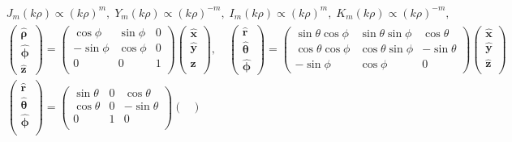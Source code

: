 \documentclass[10pt]{article}
\newcommand{\rhat}{\boldsymbol{\hat{\textbf{r}}}}
\newcommand{\xhat}{\boldsymbol{\hat{\textbf{x}}}}
\newcommand{\yhat}{\boldsymbol{\hat{\textbf{y}}}}
\newcommand{\zhat}{\boldsymbol{\hat{\textbf{z}}}}
\newcommand{\phihat}{\boldsymbol{\hat{\textbf{$\phi$}}}}
\newcommand{\thetahat}{\boldsymbol{\hat{\textbf{$\theta$}}}}
\newcommand{\rhohat}{\boldsymbol{\hat{\textbf{$\rho$}}}}
\begin{document}
\begin{multicols}{2}
\begin{align*}
		& J_m(k \rho) \propto (k \rho)^m, \; Y_m(k \rho) \propto (k \rho)^{-m}, \; I_m(k \rho) \propto (k \rho)^m, \; K_m(k \rho) \propto (k \rho)^{-m}, \tag*{As $\rho \rightarrow 0$} \\
 		&\begin{pmatrix}
			\rhohat \\
			\phihat \\
			\zhat
 		\end{pmatrix} =
 		\begin{pmatrix}
 			\cos \phi & \sin \phi & 0 \\
 			-\sin \phi & \cos \phi & 0 \\
 			0 & 0 & 1 \\
 		\end{pmatrix} 
 		\begin{pmatrix}
 			\xhat \\
 			\yhat \\
 			\zhat \\
 		\end{pmatrix}, \quad
 		\begin{pmatrix}
			\rhat \\
			\thetahat \\
			\phihat
 		\end{pmatrix} =
 		\begin{pmatrix}
			\sin \theta \cos \phi & \sin \theta \sin \phi & \cos \theta\\
			\cos \theta \cos \phi & \cos \theta \sin \phi & - \sin \theta \\
			-\sin \phi & \cos \phi & 0
 		\end{pmatrix} 
 		\begin{pmatrix}
 			\xhat \\
 			\yhat \\
 			\zhat \\
 		\end{pmatrix} \\
 		& \begin{pmatrix}
 			\rhat \\
 			\thetahat \\
 			\phihat \\
 		\end{pmatrix} = 
 		\begin{pmatrix}
 			\sin \theta & 0 & \cos \theta \\
 			\cos \theta & 0 & -\sin \theta \\
 			0 & 1 & 0 \\
 		\end{pmatrix}
 		\begin{pmatrix}

\end{pmatrix}
\end{align*}
\end{multicols}
\end{document}
